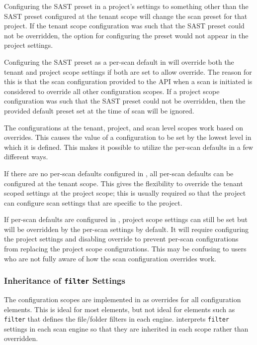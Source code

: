 Configuring the SAST preset in a project's settings to something other than
the SAST preset configured at the tenant scope will change the scan preset for that project.
If the tenant scope configuration was such that the SAST preset could not be overridden, the
option for configuring the preset would not appear in the project settings.

Configuring the SAST preset as a per-scan default in \cxoneflow will override both
the tenant and project scope settings if both are set to allow override.  The reason for this
is that the scan configuration provided to the API when a scan is initiated is considered to override
all other configuration scopes.  If a project scope configuration was such that the SAST preset could
not be overridden, then the \cxoneflow provided default preset set at the time of scan will be ignored.

The configurations at the tenant, project, and scan level scopes work based on overrides.
This causes the value of a configuration to be set by the lowest level in which it is
defined. This makes it possible to utilize the \cxoneflow per-scan defaults in a few
different ways.

If there are no per-scan defaults configured in \cxoneflow, all per-scan defaults
can be configured at the tenant scope.  This gives the flexibility to override 
the tenant scoped settings at the project scope; this is usually required so that
the project can configure scan settings that are specific to the project.

If per-scan defaults are configured in \cxoneflow, project scope settings can
still be set but will be overridden by the per-scan settings by default.  It will require
configuring the project settings and disabling override to prevent \cxoneflow per-scan
configurations from replacing the project scope configurations.  This may be confusing
to users who are not fully aware of how the scan configuration overrides work.

\subsubsection{\cxoneflow Inheritance of \texttt{filter} Settings}

The configuration scopes are implemented in \cxone as overrides for all
configuration elements.  This is ideal for most elements, but not ideal for elements
such as \texttt{filter} that defines the file/folder filters in each engine.  \cxoneflow
interprets \texttt{filter} settings in each scan engine so that they are inherited
in each scope rather than overridden.

